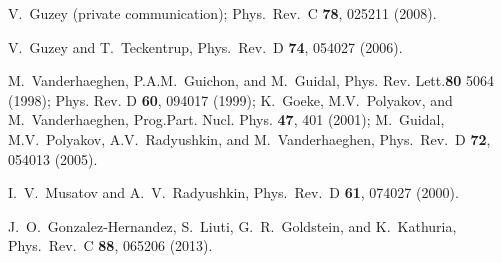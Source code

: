 \documentclass[twocolumn,nofootinbib,prl,superscriptaddress,secnumarabic,amssymb,nobibnotes,aps,floatfix]{revtex4}
\begin{document}
\begin{thebibliography}{99}
   V.~Guzey (private communication); Phys.\ Rev.\ C {\bf 78}, 025211 (2008).

V.~Guzey and T.~Teckentrup,
Phys.\ Rev.\ D {\bf 74}, 054027 (2006).

M.~Vanderhaeghen, P.A.M.~Guichon, and M.~Guidal, Phys. Rev. Lett.{\bf 80} 5064 
(1998); Phys. Rev. D {\bf 60}, 094017 (1999);
K.~Goeke, M.V.~Polyakov, and M.~Vanderhaeghen, Prog.Part. Nucl. Phys. {\bf 47}, 
401 (2001);
M.~Guidal, M.V.~Polyakov, A.V.~Radyushkin, and M.~Vanderhaeghen, Phys.\ Rev.\ D 
{\bf 72}, 054013 (2005).

I.~V.~Musatov and A.~V.~Radyushkin, 
Phys.\ Rev.\ D {\bf 61}, 074027 (2000).

J.~O.~Gonzalez-Hernandez, S.~Liuti, G.~R.~Goldstein, and K.~Kathuria,
Phys.\ Rev.\ C {\bf 88}, 065206 (2013).

\end{thebibliography}
\end{document}
